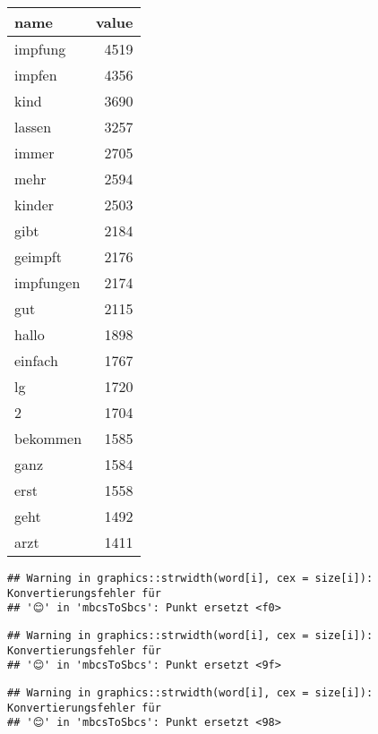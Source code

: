 \documentclass[
]{book}
\newenvironment{Shaded}{\begin{snugshade}}{\end{snugshade}}
\newcommand{\CommentTok}[1]{\textcolor[rgb]{0.56,0.35,0.01}{\textit{#1}}}
\newcommand{\KeywordTok}[1]{\textcolor[rgb]{0.13,0.29,0.53}{\textbf{#1}}}
\newcommand{\NormalTok}[1]{#1}
\newcommand{\OperatorTok}[1]{\textcolor[rgb]{0.81,0.36,0.00}{\textbf{#1}}}
\newcommand{\StringTok}[1]{\textcolor[rgb]{0.31,0.60,0.02}{#1}}
\begin{document}
\begin{tabular}{l|r}
\hline
name & value\\
\hline
impfung & 4519\\
\hline
impfen & 4356\\
\hline
kind & 3690\\
\hline
lassen & 3257\\
\hline
immer & 2705\\
\hline
mehr & 2594\\
\hline
kinder & 2503\\
\hline
gibt & 2184\\
\hline
geimpft & 2176\\
\hline
impfungen & 2174\\
\hline
gut & 2115\\
\hline
hallo & 1898\\
\hline
einfach & 1767\\
\hline
lg & 1720\\
\hline
2 & 1704\\
\hline
bekommen & 1585\\
\hline
ganz & 1584\\
\hline
erst & 1558\\
\hline
geht & 1492\\
\hline
arzt & 1411\\
\hline
\end{tabular}

\begin{Shaded}
\end{Shaded}

\begin{verbatim}
## Warning in graphics::strwidth(word[i], cex = size[i]): Konvertierungsfehler für
## '😊' in 'mbcsToSbcs': Punkt ersetzt <f0>
\end{verbatim}

\begin{verbatim}
## Warning in graphics::strwidth(word[i], cex = size[i]): Konvertierungsfehler für
## '😊' in 'mbcsToSbcs': Punkt ersetzt <9f>
\end{verbatim}

\begin{verbatim}
## Warning in graphics::strwidth(word[i], cex = size[i]): Konvertierungsfehler für
## '😊' in 'mbcsToSbcs': Punkt ersetzt <98>
\end{verbatim}
\end{document}
